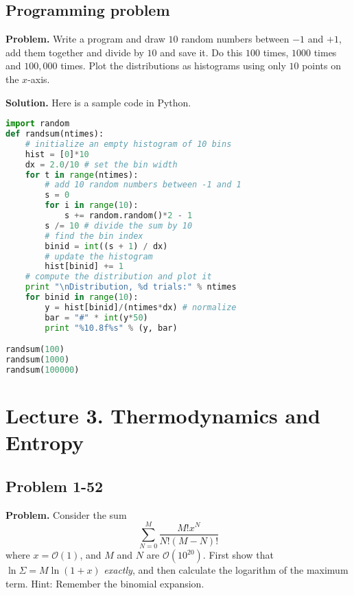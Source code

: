 \documentclass[twocolumn, 10pt]{article}
\numberwithin{equation}{section}
\newenvironment{problem}
{\par\medskip\sffamily \color{problue}
  \textbf{Problem. }\ignorespaces}
{\medskip}
\newenvironment{solution}
{\par\medskip
  \textbf{Solution. }\ignorespaces}
{\medskip}
\begin{document}
\subsection{Programming problem}

\begin{problem}
Write a program and draw $10$ random numbers between $-1$ and $+1$,
add them together and divide by $10$ and save it.
Do this $100$ times, $1000$ times and $100,000$ times.
Plot the distributions as histograms using only $10$ points on the $x$-axis.
\end{problem}

\begin{solution}
Here is a sample code in Python.
\begin{lstlisting}[language=Python]
import random
def randsum(ntimes):
    # initialize an empty histogram of 10 bins
    hist = [0]*10
    dx = 2.0/10 # set the bin width
    for t in range(ntimes):
        # add 10 random numbers between -1 and 1
        s = 0
        for i in range(10):
            s += random.random()*2 - 1
        s /= 10 # divide the sum by 10
        # find the bin index
        binid = int((s + 1) / dx)
        # update the histogram
        hist[binid] += 1
    # compute the distribution and plot it
    print "\nDistribution, %d trials:" % ntimes
    for binid in range(10):
        y = hist[binid]/(ntimes*dx) # normalize
        bar = "#" * int(y*50)
        print "%10.8f%s" % (y, bar)

randsum(100)
randsum(1000)
randsum(100000)
\end{lstlisting}
\end{solution}




\section{Lecture 3. Thermodynamics and Entropy}

\subsection{Problem 1-52}

\begin{problem}
  Consider the sum
  $$
  \sum_{N=0}^M \frac{ M! x^N } { N! (M-N)! }
  $$
  where $x = \mathcal O(1)$,
  and $M$ and $N$ are $\mathcal O(10^{20})$.
  First show that
  $\ln\Sigma = M \ln(1+x)$
  \emph{exactly}, and then calculate
  the logarithm of the maximum term.
  Hint: Remember the binomial expansion.
\end{problem}
\end{document}
